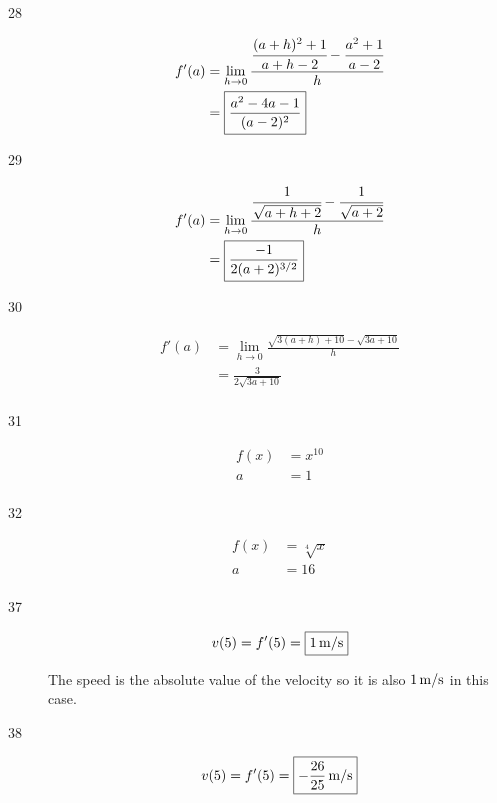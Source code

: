 \documentclass[letterpaper, landscape]{exam}
\begin{document}
\begin{description}
      \item[28]
        \begin{align*}
          f'(a) & = \lim_{h \to 0} \frac{ \cfrac{(a + h)^2 + 1}{a + h - 2} - \cfrac{a^2 + 1}{a - 2}}{h} \\
                & = \boxed{ \frac{a^2 - 4a - 1}{(a - 2)^2} } \\
        \end{align*}

      \item[29]
        \begin{align*}
          f'(a) & = \lim_{h \to 0} \frac{ \cfrac{1}{\sqrt{a + h + 2}} - \cfrac{1}{\sqrt{a + 2}}}{h} \\
                & = \boxed{ \frac{-1}{2(a + 2)^{3/2}} } \\
        \end{align*}

      \newpage 

      \item[30]
        \begin{align*}
          f'(a) & = \lim_{h \to 0} \frac{ \sqrt{3(a + h) + 10} - \sqrt{3a + 10} }{h} \\
                & = \boxed{ \frac{3}{2 \sqrt{3a + 10}} } \\
        \end{align*}

      \item[31]
        \begin{align*}
          f(x) & = x^{10} \\
          a    & = 1 \\
        \end{align*}

      \item[32]
        \begin{align*}
          f(x) & = \sqrt[4]{x} \\
          a    & = 16 \\
        \end{align*}

      \item[37]
        \[
          v(5) = f'(5) = \boxed{\unit[1]{m/s}} 
        \]

        The speed is the absolute value of the velocity so it is also $\unit[1]{m/s}$ in this case.

      \item[38]
        \[
          v(5) = f'(5) = \boxed{ \unit[ - \frac{26}{25} ]{m/s} } 
        \]


\end{description}
\end{document}
